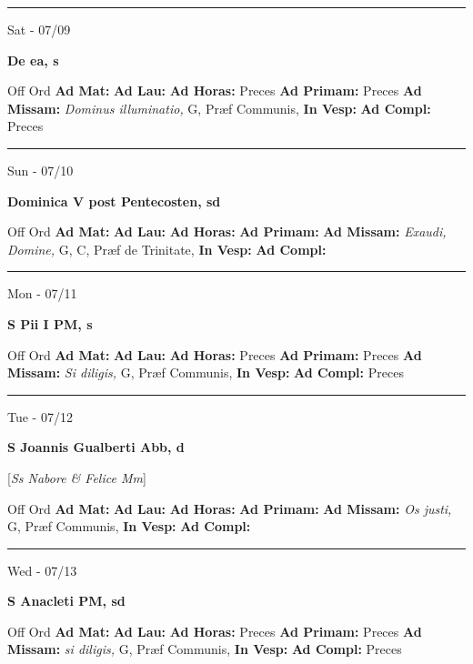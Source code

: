 \documentclass[letterpaper, 10pt]{article}
\begin{document}
\hrule
\begin{center}
Sat - 07/09
\end{center}\textbf{ \large De ea, \textnormal{\normalsize s}}
\begin{justify}
Off Ord
\textbf{Ad Mat: }
\textbf{Ad Lau: }
\textbf{Ad Horas: }Preces
\textbf{Ad Primam: }Preces
\textbf{Ad Missam:} \textit{Dominus illuminatio, } G, Præf Communis, 
\textbf{In Vesp: }
\textbf{Ad Compl: }Preces\end{justify}



\hrule
\begin{center}
Sun - 07/10
\end{center}\textbf{ \large Dominica V post Pentecosten, \textnormal{\normalsize sd}}
\begin{justify}
Off Ord
\textbf{Ad Mat: }
\textbf{Ad Lau: }
\textbf{Ad Horas: }
\textbf{Ad Primam: }
\textbf{Ad Missam:} \textit{Exaudi, Domine, } G, C, Præf de Trinitate, 
\textbf{In Vesp: }
\textbf{Ad Compl: }\end{justify}



\hrule
\begin{center}
Mon - 07/11
\end{center}\textbf{ \large S Pii I PM, \textnormal{\normalsize s}}
\begin{justify}
Off Ord
\textbf{Ad Mat: }
\textbf{Ad Lau: }
\textbf{Ad Horas: }Preces
\textbf{Ad Primam: }Preces
\textbf{Ad Missam:} \textit{Si diligis, } G, Præf Communis, 
\textbf{In Vesp: }
\textbf{Ad Compl: }Preces\end{justify}



\hrule
\begin{center}
Tue - 07/12
\end{center}\textbf{ \large S Joannis Gualberti Abb, \textnormal{\normalsize d}}

[\textit{Ss Nabore \& Felice Mm}]
\begin{justify}
Off Ord
\textbf{Ad Mat: }
\textbf{Ad Lau: }
\textbf{Ad Horas: }
\textbf{Ad Primam: }
\textbf{Ad Missam:} \textit{Os justi, } G, Præf Communis, 
\textbf{In Vesp: }
\textbf{Ad Compl: }\end{justify}



\hrule
\begin{center}
Wed - 07/13
\end{center}\textbf{ \large S Anacleti PM, \textnormal{\normalsize sd}}
\begin{justify}
Off Ord
\textbf{Ad Mat: }
\textbf{Ad Lau: }
\textbf{Ad Horas: }Preces
\textbf{Ad Primam: }Preces
\textbf{Ad Missam:} \textit{si diligis, } G, Præf Communis, 
\textbf{In Vesp: }
\textbf{Ad Compl: }Preces\end{justify}
\end{document}
